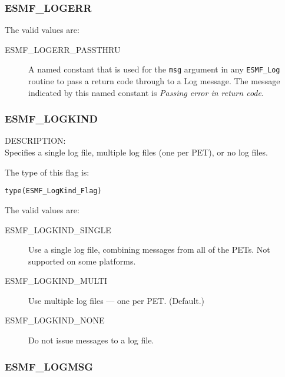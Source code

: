 

\subsubsection{ESMF\_LOGERR}
\label{const:logerr}

The valid values are:
\begin{description}
	\item [ESMF\_LOGERR\_PASSTHRU]
		A named constant that is used for the {\tt msg} argument in any {\tt ESMF\_Log} 
		routine to pass a return code through to a Log message.  The message indicated 
		by this named constant is {\it Passing error in return code}.
\end{description}

\subsubsection{ESMF\_LOGKIND}
\label{const:logkindflag}

{\sf DESCRIPTION:\\}
Specifies a single log file, multiple log files (one per PET), or no log files.

The type of this flag is:

{\tt type(ESMF\_LogKind\_Flag)}

The valid values are:
\begin{description}
   \item [ESMF\_LOGKIND\_SINGLE] 
         Use a single log file, combining messages from all of the PETs.  Not supported on some platforms.
   \item [ESMF\_LOGKIND\_MULTI]
         Use multiple log files --- one per PET.  (Default.)
   \item [ESMF\_LOGKIND\_NONE]
         Do not issue messages to a log file.
\end{description}

\subsubsection{ESMF\_LOGMSG}
\label{const:logmsgflag}

